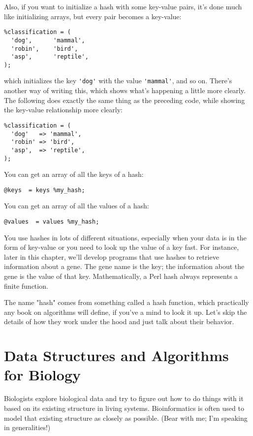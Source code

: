 Also, if you want to initialize a hash with some key-value pairs, it's done much like initializing arrays, but every pair becomes a key-value: 

\begin{lstlisting}
%classification = (
  'dog',      'mammal',
  'robin',    'bird',
  'asp',      'reptile',
);
\end{lstlisting}

which initializes the key \verb|'dog'| with the value \verb|'mammal'|, and so on. There's another way of writing this, which shows what's happening a little more clearly. The following does exactly the same thing as the preceding code, while showing the key-value relationship more clearly: 

\begin{lstlisting}
%classification = (
  'dog'   => 'mammal',
  'robin' => 'bird',
  'asp',  => 'reptile',
);
\end{lstlisting}

You can get an array of all the keys of a hash:

\begin{lstlisting}
@keys  = keys %my_hash;
\end{lstlisting}

You can get an array of all the values of a hash:

\begin{lstlisting}
@values  = values %my_hash;
\end{lstlisting}

You use hashes in lots of different situations, especially when your data is in the form of key-value or you need to look up the value of a key fast. For instance, later in this chapter, we'll develop programs that use hashes to retrieve information about a gene. The gene name is the key; the information about the gene is the value of that key. Mathematically, a Perl hash always represents a finite function.

The name "hash" comes from something called a hash function, which practically any book on algorithms will define, if you've a mind to look it up. Let's skip the details of how they work under the hood and just talk about their behavior. 

\section{Data Structures and Algorithms for Biology}
Biologists explore biological data and try to figure out how to do things with it based on its existing structure in living systems.  Bioinformatics is often used to model that existing structure as closely as possible. (Bear with me; I'm speaking in generalities!)

